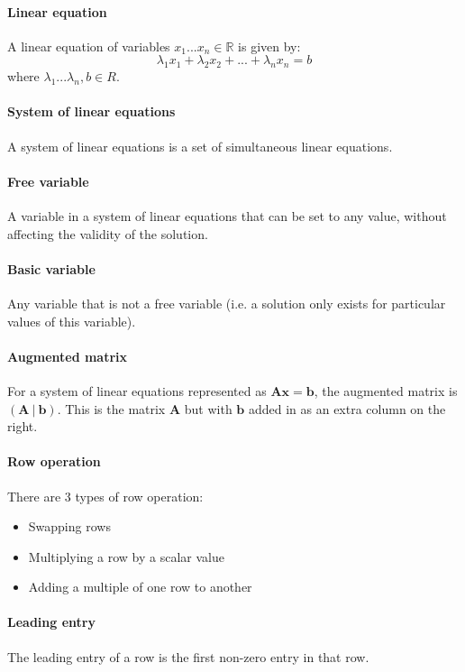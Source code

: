 \documentclass{scrartcl}
\newcommand{\R}{\mathbb{R}}
\renewcommand{\vec}[1]{\mathbf{#1}}
\begin{document}
\paragraph{Linear equation}
A linear equation of variables $ x_{1}...x_{n} \in \R $ is given by:
\begin{equation}
\lambda_{1} x_{1} + \lambda_{2} x_{2} + ... + \lambda_{n} x_{n} = b
\end{equation}
where $ \lambda_{1} ... \lambda_{n}, b \in R $.

\paragraph{System of linear equations}
A system of linear equations is a set of simultaneous linear equations.

\paragraph{Free variable}
A variable in a system of linear equations that can be set to any value, without affecting the validity of the solution.

\paragraph{Basic variable}
Any variable that is not a free variable (i.e. a solution only exists for particular values of this variable).

\paragraph{Augmented matrix}
For a system of linear equations represented as $ \vec{A} \vec{x} = \vec{b} $, the augmented matrix is $ (\vec{A} \ | \ \vec{b}) $. This is the matrix $ \vec{A} $ but with $ \vec{b} $ added in as an extra column on the right.

\paragraph{Row operation}
There are 3 types of row operation:
\begin{itemize}
\item Swapping rows
\item Multiplying a row by a scalar value
\item Adding a multiple of one row to another
\end{itemize}

\paragraph{Leading entry}
The leading entry of a row is the first non-zero entry in that row.
\end{document}
